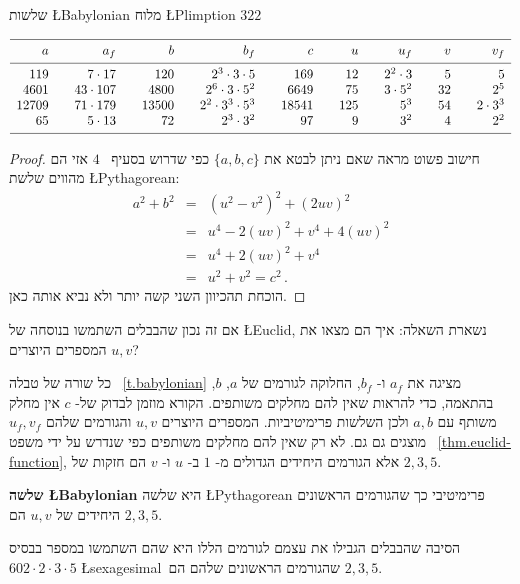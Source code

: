 \begin{table}[tb]
\caption{שלשות \L{Babylonian} מלוח \L{Plimption} $322$}
\label{t.babylonian}
\[
\begin{array}{r@{$\quad\quad$}r@{$\quad\quad$}r@{$\quad\quad$}r@{$\quad\quad$}r@{$\quad\quad$}r@{$\quad\quad$}r@{$\quad\quad$}r@{$\quad\quad$}r}
\hline
\noalign{\smallskip}
a&a_f &b&b_f &c&u&u_f &v&v_f\\
\noalign{\smallskip}\hline\noalign{\smallskip}
119&7\cdot 17 &120&2^3 \cdot 3\cdot 5 & 169&12&2^2\cdot 3&5&5\\
4601 &43\cdot 107&4800&2^6 \cdot 3 \cdot 5^2& 6649&75&3\cdot 5^2&32&2^5\\
12709 &71\cdot 179&13500&2^2 \cdot 3^3 \cdot 5^3& 18541&125&5^3&54&2\cdot 3^3\\
65 &5\cdot 13&72&2^3 \cdot 3^2 & 97&9&3^2&4&2^2\\
\noalign{\smallskip}\hline
\end{array}
\]
\end{table}

\begin{proof}
חישוב פשוט מראה שאם ניתן לבטא את
$\{a,b,c\}$
כפי שדרוש בסעיף%
~$4$
אזי הם מהווים שלשת
\L{Pythagorean}:
\begin{eqnarray*}
a^2+b^2&=&(u^2-v^2)^2 + (2uv)^2\\
&=& u^4-2(uv)^2+v^4+4(uv)^2\\
&=&u^4+2(uv)^2+v^4\\
&=&u^2+v^2=c^2\,.
\end{eqnarray*}
הוכחת תהכיוון השני קשה יותר ולא נביא אותה כאן.
\end{proof}

אם זה נכון שהבבלים השתמשו בנוסחה של
\L{Euclid},
נשארת השאלה: איך הם מצאו את המספרים היוצרים
$u,v$?

כל שורה של טבלה%
~\ref{t.babylonian}
מציגה את 
$a_f$
ו-%
$b_f $,
החלוקה לגורמים של
$a$, $b$,
בהתאמה, כדי להראות שאין להם מחלקים משותפים. הקורא מוזמן לבדוק של-%
$c$
אין מחלק משותף עם
$a,b$
ולכן השלשות פרימיטיביות. המספרים היוצרים 
$u,v$
והגורמים שלהם
$u_f ,v_f$
מוצגים גם גם. לא רק שאין להם מחלקים משותפים כפי שנדרש על ידי משפט%
~\ref{thm.euclid-function},
אלא הגורמים היחידים הגדולים מ-%
$1$
ב-%
$u$
ו-%
$v$
הם חזקות של 
$2,3,5$.
\begin{definition}
\textbf{שלשה \L{Babylonian}}
היא שלשה 
\L{Pythagorean}
פרימיטיבי כך שהגורמים הראשונים היחידים של
$u,v$
הם
$2,3,5$.
\end{definition}
הסיבה שהבבלים הגבילו את עצמם לגורמים הללו היא שהם השתמשו במספר בבסיס 
$602\cdot 2\cdot 3\cdot 5$
\L{sexagesimal}\
שהגורמים הראשונים שלהם הם
$2,3,5$.

